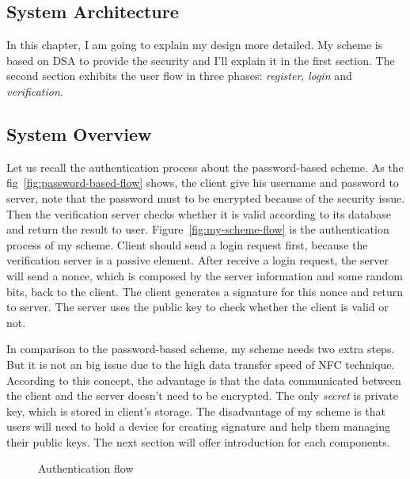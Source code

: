 \begin{CJK}{Bg5}{bsmi}


\chapter{System Architecture}

In this chapter, I am going to explain my design more detailed. My scheme is based on DSA to provide the security and I'll explain it in the first section. The second section exhibits the user flow in three phases: \emph{register}, \emph{login} and \emph{verification}.

\section{System Overview}

Let us recall the authentication process about the password-based scheme. As the fig~\ref{fig:password-based-flow} shows, the client give his username and password to server, note that the password must to be encrypted because of the security issue. Then the verification server checks whether it is valid according to its database and return the result to user. Figure~\ref{fig:my-scheme-flow} is the authentication process of my scheme. Client should send a login request first, because the verification server is a passive element. After receive a login request, the server will send a nonce, which is composed by the server information and some random bits, back to the client. The client generates a signature for this nonce and return to server. The server uses the public key to check whether the client is valid or not.

In comparison to the password-based scheme, my scheme needs two extra steps. But it is not an big issue due to the high data transfer speed of NFC technique. According to this concept, the advantage is that the data communicated between the client and the server doesn't need to be encrypted. The only \emph{secret} is private key, which is stored in client's storage. The disadvantage of my scheme is that users will need to hold a device for creating signature and help them managing their public keys. The next section will offer introduction for each components.
\begin{figure}
\centering
{}
\caption{Authentication flow}
\end{figure}


\end{CJK}
